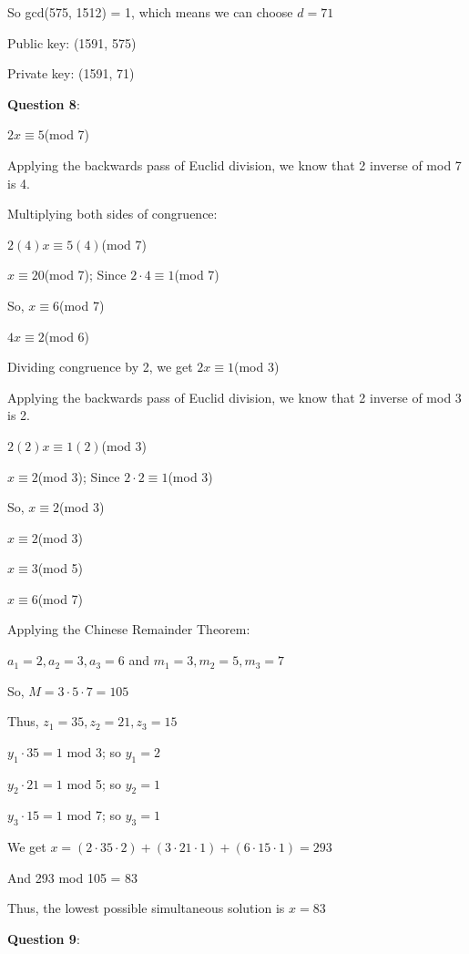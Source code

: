 \documentclass{article} %
\newcommand{\question}[2][]{\begin{flushleft}
        \textbf{Question #1}: #2

\end{flushleft}}
\begin{document}
    So gcd(575, 1512) = 1, which means we can choose $d = 71$

    Public key: (1591, 575)

    Private key: (1591, 71)

    \question[8]{}

    $2x \equiv 5$(mod 7)
    
    Applying the backwards pass of Euclid division, we know that 2 inverse of mod 7 is 4.

    Multiplying both sides of congruence:

    $2(4)x \equiv 5(4)$(mod 7)

    $x \equiv 20$(mod 7); Since $2 \cdot 4 \equiv 1$(mod 7)

    So, $x \equiv 6$(mod 7)

    \vspace{0.2cm}

    $4x \equiv 2$(mod 6)

    Dividing congruence by 2, we get $2x \equiv 1$(mod 3)

    Applying the backwards pass of Euclid division, we know that 2 inverse of mod 3 is 2.

    $2(2)x \equiv 1(2)$(mod 3)

    $x \equiv 2$(mod 3); Since $2 \cdot 2 \equiv 1$(mod 3)

    So, $x \equiv 2$(mod 3)

    \vspace{0.2cm}
    
    $x \equiv 2$(mod 3)
    
    $x \equiv 3$(mod 5)
    
    $x \equiv 6$(mod 7)

    Applying the Chinese Remainder Theorem:

    $a_1 = 2, a_2 = 3, a_3 = 6$ and $m_1 = 3, m_2 = 5, m_3 = 7$

    So, $M = 3 \cdot 5 \cdot 7 = 105$

    Thus, $z_1 = 35, z_2 = 21, z_3 = 15$

    $y_1 \cdot 35 = 1$ mod 3; so $y_1 = 2$

    $y_2 \cdot 21 = 1$ mod 5; so $y_2 = 1$

    $y_3 \cdot 15 = 1$ mod 7; so $y_3 = 1$

    We get $x = (2 \cdot 35 \cdot 2) + (3 \cdot 21 \cdot 1) + (6 \cdot 15 \cdot 1) = 293$

    And 293 mod 105 = 83

    Thus, the lowest possible simultaneous solution is $x = 83$

    \newpage

    \question[9]{}

    
    
    
\end{document}
